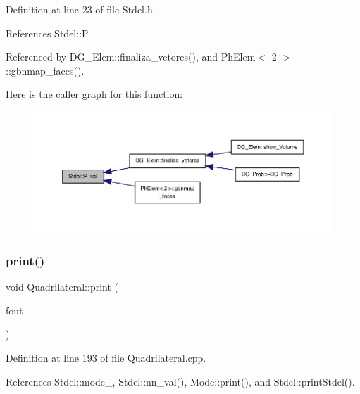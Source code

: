 Definition at line 23 of file Stdel.\+h.



References Stdel\+::P.



Referenced by D\+G\+\_\+\+Elem\+::finaliza\+\_\+vetores(), and Ph\+Elem$<$ 2 $>$\+::gbnmap\+\_\+faces().

Here is the caller graph for this function\+:
\nopagebreak
\begin{figure}[H]
\begin{center}
\leavevmode
\includegraphics[width=350pt]{classStdel_a701c7d5595d4f6632333c4202898983b_icgraph}
\end{center}
\end{figure}
\mbox{\label{classQuadrilateral_a6d1ef249f5359f422028e0635ccf1da7}} 
\subsubsection{\texorpdfstring{print()}{print()}}
{\footnotesize\ttfamily void Quadrilateral\+::print (\begin{DoxyParamCaption}\item[{F\+I\+LE $\ast$}]{fout }\end{DoxyParamCaption})}



Definition at line 193 of file Quadrilateral.\+cpp.



References Stdel\+::mode\+\_\+, Stdel\+::nn\+\_\+val(), Mode\+::print(), and Stdel\+::print\+Stdel().

